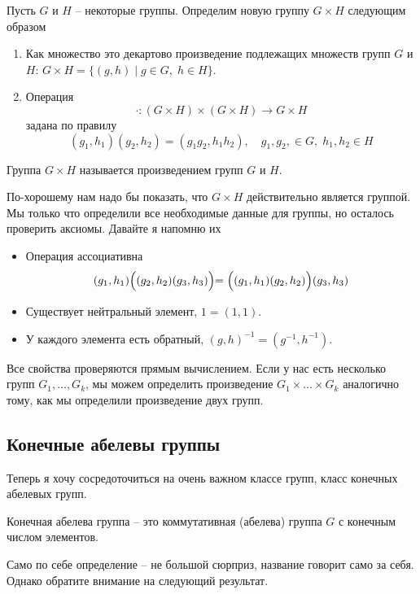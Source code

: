 \begin{definition}
Пусть $G$ и $H$ -- некоторые группы.
Определим новую группу $G\times H$ следующим образом
\begin{enumerate}
\item Как множество это декартово произведение подлежащих множеств групп $G$ и $H$: $G\times H = \{(g, h)\mid g\in G,\;h\in H\}$.

\item Операция
\[
\cdot \colon (G\times H)\times (G\times H) \to G\times H
\]
задана по правилу
\[
(g_1, h_1) (g_2, h_2) = (g_1 g_2, h_1 h_2),\quad g_1, g_2,\in G, \;h_1, h_2\in H
\]
\end{enumerate}
Группа $G\times H$ называется произведением групп $G$ и $H$.
\end{definition}

По-хорошему нам надо бы показать, что $G\times H$ действительно является группой.
Мы только что определили все необходимые данные для группы, но осталось проверить аксиомы.
Давайте я напомню их
\begin{itemize}
\item Операция ассоциативна
\[
(g_1, h_1)\Bigl( (g_2, h_2) (g_3, h_3) \Bigl) = \Bigl((g_1, h_1) (g_2, h_2)\Bigl) (g_3, h_3)
\]

\item Существует нейтральный элемент, $1 = (1, 1)$.

\item У каждого элемента есть обратный,  $(g, h)^{-1} = (g^{-1}, h^{-1})$.
\end{itemize}
Все свойства проверяются прямым вычислением.
Если у нас есть несколько групп $G_1,\ldots,G_k$, мы можем определить произведение $G_1\times \ldots \times G_k$ аналогично тому, как мы определили произведение двух групп.

\subsection{Конечные абелевы группы}

Теперь я хочу сосредоточиться на очень важном классе групп, класс конечных абелевых групп.

\begin{definition}
Конечная абелева группа -- это коммутативная (абелева) группа $G$ с конечным числом элементов.
\end{definition}

Само по себе определение -- не большой сюрприз, название говорит само за себя.
Однако обратите внимание на следующий результат.

